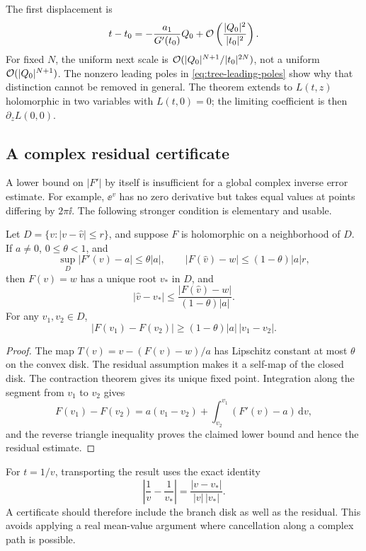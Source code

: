 The first displacement is
\[
 t-t_0=-\frac{a_1}{G'(t_0)}Q_0
       +\mathcal O\left(\frac{|Q_0|^2}{|t_0|^2}\right).
\]
For fixed \(N\), the uniform next scale is
\(\mathcal O(|Q_0|^{N+1}/|t_0|^{2N})\), not a uniform
\(\mathcal O(|Q_0|^{N+1})\).
The nonzero leading poles in \cref{eq:tree-leading-poles}
show why that distinction cannot be removed in general.
The theorem extends to \(L(t,z)\) holomorphic in two variables
with \(L(t,0)=0\); the limiting coefficient is then
\(\partial_zL(0,0)\).

\subsection{A complex residual certificate}

A lower bound on \(|F'|\) by itself is insufficient for a global
complex inverse error estimate.  For example, \(\ee^v\) has
no zero derivative but takes equal values at points differing by
\(2\pi\ii\).  The following stronger condition is elementary and usable.

\begin{proposition}\label{prop:residual}
Let \(D=\{v:|v-\widehat v|\le r\}\), and suppose \(F\) is
holomorphic on a neighborhood of \(D\).
If \(a\ne0\), \(0\le\theta<1\), and
\[
 \sup_D|F'(v)-a|\le\theta|a|,
 \qquad |F(\widehat v)-w|\le(1-\theta)|a|r,
\]
then \(F(v)=w\) has a unique root \(v_*\) in \(D\), and
\[
 |\widehat v-v_*|
 \le \frac{|F(\widehat v)-w|}{(1-\theta)|a|}.
\]
For any \(v_1,v_2\in D\),
\[
 |F(v_1)-F(v_2)|\ge(1-\theta)|a|\,|v_1-v_2|.
\]
\end{proposition}
\begin{proof}
The map \(T(v)=v-(F(v)-w)/a\) has Lipschitz constant at most
\(\theta\) on the convex disk.  The residual assumption makes it a
self-map of the closed disk.  The contraction theorem gives its
unique fixed point.  Integration along the segment from \(v_1\)
to \(v_2\) gives
\[
 F(v_1)-F(v_2)=a(v_1-v_2)+
 \int_{v_2}^{v_1}(F'(v)-a)\,\mathrm dv,
\]
and the reverse triangle inequality proves the claimed lower bound
and hence the residual estimate.
\end{proof}

For \(t=1/v\), transporting the result uses the exact identity
\[
 \left|\frac1v-\frac1{v_*}\right|
 =\frac{|v-v_*|}{|v|\,|v_*|}.
\]
A certificate should therefore include the branch disk as well as
the residual.  This avoids applying a real mean-value argument
where cancellation along a complex path is possible.

